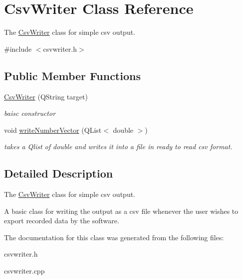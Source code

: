 \hypertarget{class_csv_writer}{\section{Csv\+Writer Class Reference}
\label{class_csv_writer}
}


The \hyperlink{class_csv_writer}{Csv\+Writer} class for simple csv output.  




{\ttfamily \#include $<$csvwriter.\+h$>$}

\subsection*{Public Member Functions}
\begin{DoxyCompactItemize}
\item 
\hypertarget{class_csv_writer_a8f3f5e1c1c5fa1eaedae5e5a0d1f67b8}{\hyperlink{class_csv_writer_a8f3f5e1c1c5fa1eaedae5e5a0d1f67b8}{Csv\+Writer} (Q\+String target)}\label{class_csv_writer_a8f3f5e1c1c5fa1eaedae5e5a0d1f67b8}

\begin{DoxyCompactList}\small\item\em baisc constructor \end{DoxyCompactList}\item 
\hypertarget{class_csv_writer_a09a14e598141fcc553c8f51231f59ce0}{void \hyperlink{class_csv_writer_a09a14e598141fcc553c8f51231f59ce0}{write\+Number\+Vector} (Q\+List$<$ double $>$)}\label{class_csv_writer_a09a14e598141fcc553c8f51231f59ce0}

\begin{DoxyCompactList}\small\item\em takes a Qlist of double and writes it into a file in ready to read csv format. \end{DoxyCompactList}\end{DoxyCompactItemize}


\subsection{Detailed Description}
The \hyperlink{class_csv_writer}{Csv\+Writer} class for simple csv output. 

A basic class for writing the output as a csv file whenever the user wishes to export recorded data by the software. 

The documentation for this class was generated from the following files\+:\begin{DoxyCompactItemize}
\item 
csvwriter.\+h\item 
csvwriter.\+cpp\end{DoxyCompactItemize}
